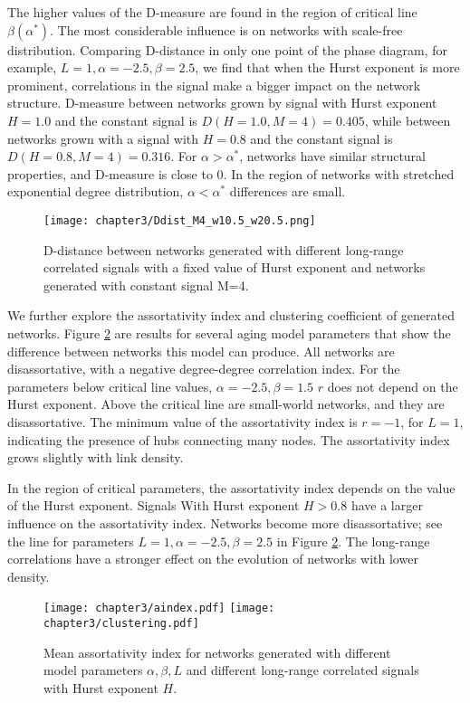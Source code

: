 The higher values of the D-measure are found in the region of critical line $\beta(\alpha^{*})$. The most considerable influence is on networks with scale-free distribution. Comparing D-distance in only one point of the phase diagram, for example, $L=1, \alpha = -2.5, \beta = 2.5$, we find that when the Hurst exponent is more prominent, correlations in the signal make a bigger impact on the network structure. D-measure between networks grown by signal with Hurst exponent $H=1.0$ and the constant signal is $D(H=1.0, M=4) = 0.405$, while between networks grown with a signal with $H=0.8$ and the constant signal is $D(H=0.8, M=4) = 0.316$. For $\alpha>\alpha^{*}$, networks have similar structural properties, and D-measure is close to 0. In the region of networks with stretched exponential degree distribution, $\alpha<\alpha^{*}$  differences are small. 

\begin{figure}[H]
	\centering
	\texttt{[image: chapter3/Ddist\_M4\_w10.5\_w20.5.png]}
	\caption[D-distance for networks generated with monofractal signals. ]{D-distance between networks generated with different long-range correlated signals with a fixed value of Hurst exponent and networks generated with constant signal M=4.}
	\label{fig:Ddist_m}
\end{figure}


We further explore the assortativity index and clustering coefficient of generated networks. Figure \ref{fig:aindex} are results for several aging model parameters that show the difference between networks this model can produce. All networks are disassortative, with a negative degree-degree correlation index. For the parameters below critical line values, $\alpha=-2.5, \beta=1.5$ $r$ does not depend on the Hurst exponent. Above the critical line are small-world networks, and they are disassortative. The minimum value of the assortativity index is $r =-1$, for $L=1$, indicating the presence of hubs connecting many nodes. The assortativity index grows slightly with link density. 

In the region of critical parameters, the assortativity index depends on the value of the Hurst exponent. Signals With Hurst exponent $H>0.8$ have a larger influence on the assortativity index. Networks become more disassortative; see the line for parameters $L=1, \alpha=-2.5, \beta=2.5$ in Figure \ref{fig:aindex}. The long-range correlations have a stronger effect on the evolution of networks with lower density. 

\begin{figure}[h!]
	\centering
	\texttt{[image: chapter3/aindex.pdf]}
	\texttt{[image: chapter3/clustering.pdf]}
	\caption[Assortativity index and mean clustering coefficient.]{Mean assortativity index for networks generated  with different model parameters $\alpha, \beta, L$ and different long-range correlated signals with Hurst exponent $H$.}
	\label{fig:aindex}
\end{figure} 

